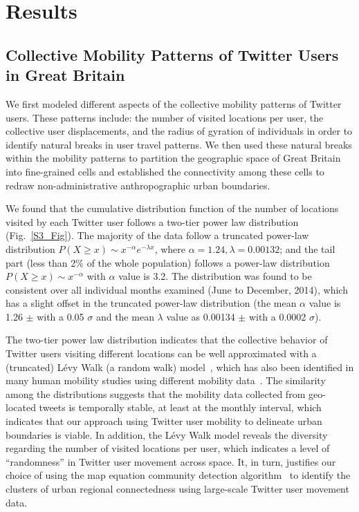 \documentclass[]{tGIS2e}
\begin{document}
\section{Results}
\subsection{Collective Mobility Patterns of Twitter Users in Great Britain}
We first modeled different aspects of the collective mobility patterns of Twitter users.
These patterns include: the number of visited locations per user,  the collective user displacements, and the radius of gyration of individuals in order to identify natural breaks in user travel patterns.
We then used these natural breaks within the mobility patterns to partition the geographic space of Great Britain into fine-grained cells and established the connectivity among these cells to redraw non-administrative anthropographic urban boundaries. 

We found that the cumulative distribution function of the number of locations visited by each Twitter user follows a two-tier power law distribution (Fig.~\ref{S3_Fig}). 
The majority of the data follow a truncated power-law distribution $P(X\geq x)\sim x^{-\alpha}e^{-\lambda x}$, where $\alpha = 1.24, \lambda =0.00132$; and the tail part (less than 2$\%$ of the whole population) follows a power-law distribution  $P(X \geq x)\sim x^{-\alpha}$ with $\alpha$ value is 3.2.
The distribution was found to be consistent over all individual months examined (June to December, 2014), which has a slight offset in the truncated power-law distribution (the mean $\alpha$ value is 1.26 $ \pm$ with a 0.05 $\sigma$ and the mean $\lambda$ value as 0.00134 $ \pm$  with a 0.0002 $\sigma$). 

The two-tier power law distribution indicates that the collective behavior of Twitter users visiting different locations can be well approximated with a (truncated) L\'{e}vy Walk (a random walk) model~\citep{rhee2011,reynolds2012}, which has also been identified in many human mobility studies using different mobility data~\citep{zhao2015}.
The similarity among the distributions suggests that the mobility data collected from geo-located tweets is temporally stable, at least at the monthly interval, which indicates that our approach using Twitter user mobility to delineate urban boundaries is viable.  
In addition, the L\'{e}vy Walk model reveals the diversity regarding the number of visited locations per user, which indicates a level of ``randomness'' in Twitter user movement across space. 
It, in turn, justifies our choice of using the map equation community detection algorithm~\citep{rosvall2008} to identify the clusters of urban regional connectedness using large-scale Twitter user movement data.
\end{document}

